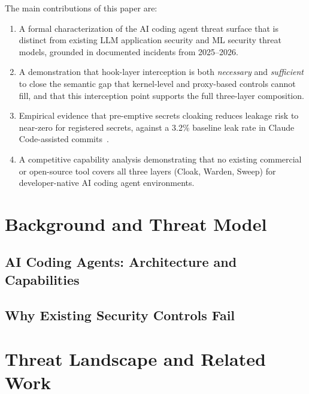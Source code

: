 \documentclass[11pt,letterpaper]{article}
\begin{document}
The main contributions of this paper are:
\begin{enumerate}[leftmargin=*, label=(\arabic*)]
  \item A formal characterization of the AI coding agent threat surface that is
        distinct from existing LLM application security and ML security threat models,
        grounded in documented incidents from 2025--2026.
  \item A demonstration that hook-layer interception is both \emph{necessary} and
        \emph{sufficient} to close the semantic gap that kernel-level and proxy-based
        controls cannot fill, and that this interception point supports the full
        three-layer composition.
  \item Empirical evidence that pre-emptive secrets cloaking reduces leakage risk
        to near-zero for registered secrets, against a 3.2\% baseline leak rate in
        Claude Code-assisted commits~\cite{gitguardian2026state}.
  \item A competitive capability analysis demonstrating that no existing commercial
        or open-source tool covers all three layers (Cloak, Warden, Sweep) for
        developer-native AI coding agent environments.
\end{enumerate}

\section{Background and Threat Model}

\subsection{AI Coding Agents: Architecture and Capabilities}

\subsection{Why Existing Security Controls Fail}

\section{Threat Landscape and Related Work}
\label{sec:related}
\end{document}
